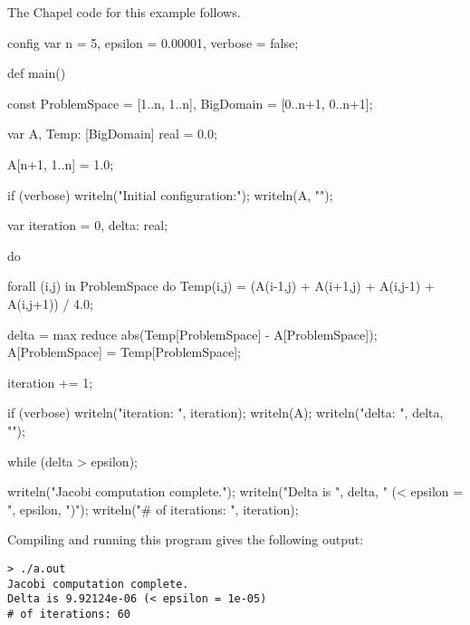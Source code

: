The Chapel code for this example follows.  
\begin{numberedchapel}
config var n = 5,
           epsilon = 0.00001,
           verbose = false;

def main() {
  const ProblemSpace = [1..n, 1..n],
        BigDomain = [0..n+1, 0..n+1];

  var A, Temp: [BigDomain] real = 0.0;

  A[n+1, 1..n] = 1.0;

  if (verbose) {
    writeln("Initial configuration:");
    writeln(A, "\n");
  }

  var iteration = 0,
      delta: real;

  do {
    forall (i,j) in ProblemSpace do
      Temp(i,j) = (A(i-1,j) + A(i+1,j) + A(i,j-1) + A(i,j+1)) / 4.0;

    delta = max reduce abs(Temp[ProblemSpace] - A[ProblemSpace]);
    A[ProblemSpace] = Temp[ProblemSpace];

    iteration += 1;

    if (verbose) {
      writeln("iteration: ", iteration);
      writeln(A);
      writeln("delta: ", delta, "\n");
    }
  } while (delta > epsilon);

  writeln("Jacobi computation complete.");
  writeln("Delta is ", delta, " (< epsilon = ", epsilon, ")");
  writeln("# of iterations: ", iteration);
}
\end{numberedchapel}

Compiling and running this program gives the following output:
\begin{verbatim}
> ./a.out
Jacobi computation complete.
Delta is 9.92124e-06 (< epsilon = 1e-05)
# of iterations: 60
\end{verbatim}

